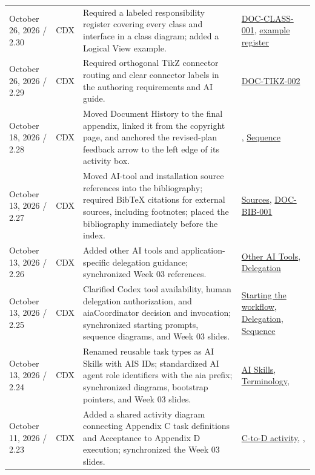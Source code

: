\begin{tabularx}{\linewidth}{L{3.1cm}L{2.2cm}YL{2.0cm}}
October 26, 2026 / 2.30 & CDX & Required a labeled responsibility register covering every class and interface in a class diagram; added a Logical View example. & \hyperref[Requirement:DOCCLASS001]{DOC-CLASS-001}, \hyperref[Table:ExampleClassResponsibilities]{example register}\\
October 26, 2026 / 2.29 & CDX & Required orthogonal TikZ connector routing and clear connector labels in the authoring requirements and AI guide. & \hyperref[Requirement:DOCTIKZ002]{DOC-TIKZ-002}\\
October 18, 2026 / 2.28 & CDX & Moved Document History to the final appendix, linked it from the copyright page, and anchored the revised-plan feedback arrow to the left edge of its activity box. & , \hyperref[Figure:AIImplementationSequence]{Sequence}\\
October 13, 2026 / 2.27 & CDX & Moved AI-tool and installation source references into the bibliography; required BibTeX citations for external sources, including footnotes; placed the bibliography immediately before the index. & \hyperref[Section:DocumentBibliography]{Sources}, \hyperref[Requirement:DOCBIB001]{DOC-BIB-001}\\
October 13, 2026 / 2.26 & CDX & Added other AI tools and application-specific delegation guidance; synchronized Week 03 references. & \hyperref[Section:AIOtherTools]{Other AI Tools}, \hyperref[Section:AIAgentDelegation]{Delegation}\\
October 13, 2026 / 2.25 & CDX & Clarified Codex tool availability, human delegation authorization, and aiaCoordinator decision and invocation; synchronized starting prompts, sequence diagrams, and Week 03 slides. & \hyperref[Section:AIImplementationStart]{Starting the workflow}, \hyperref[Section:AIAgentDelegation]{Delegation}, \hyperref[Figure:AIImplementationSequence]{Sequence}\\
October 13, 2026 / 2.24 & CDX & Renamed reusable task types as AI Skills with AIS IDs; standardized AI agent role identifiers with the aia prefix; synchronized diagrams, bootstrap pointers, and Week 03 slides. & \hyperref[Table:AISkills]{AI Skills}, \hyperref[Rule:AITerminologyConsistency]{Terminology}, \\
October 11, 2026 / 2.23 & CDX & Added a shared activity diagram connecting Appendix C task definitions and Acceptance to Appendix D execution; synchronized the Week 03 slides. & \hyperref[Figure:AITaskExecutionActivity]{C-to-D activity}, , \\

\end{tabularx}
